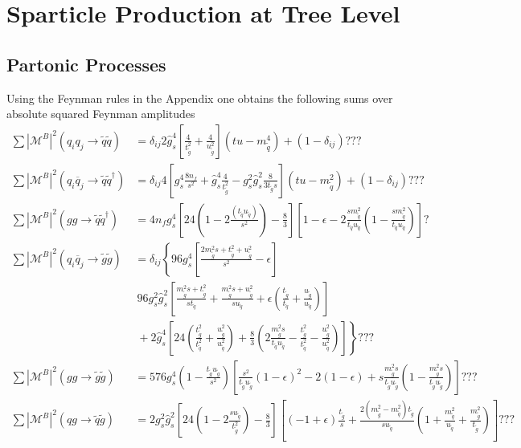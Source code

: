 \section{Sparticle Production at Tree Level}



\subsection{Partonic Processes}
Using the Feynman rules in the Appendix one obtains the following sums over absolute squared Feynman amplitudes
\begin{align}
\sum|\mathcal{M}^B|^2(q_i q_j \to \tilde{q}\tilde{q}) &= \delta_{ij} 2\hat{g}_s^4\left[ \frac{4}{t_{\tilde{g}}^2} + \frac{4}{u_{\tilde{g}}^2} \right] (tu-m_{\tilde{q}}^4) + (1-\delta_{ij}) ??? \nonumber\\
\sum|\mathcal{M}^B|^2(q_i\overline{q}_j \to \tilde{q}\tilde{q}^\dagger) &= \delta_{ij} 4 \left[ g_s^4\frac{8n_f}{s^2} + \hat{g}_s^4\frac{4}{t_{\tilde{g}}^2} - g_s^2\hat{g}_s^2\frac{8}{3 t_{\tilde{g}} s} \right] (tu-m_{\tilde{q}}^2) + (1-\delta_{ij})??? \nonumber\\
\sum|\mathcal{M}^B|^2(gg \to \tilde{q}\tilde{q}^\dagger) &= 4 n_f g_s^4 \left[ 24\left(1-2\frac{(t_{\tilde{q}}u_{\tilde{q}})}{s^2}\right)-\frac{8}{3} \right] \left[ 1-\epsilon-2\frac{s m_{\tilde{q}}^2}{t_{\tilde{q}}u_{\tilde{q}}} \left( 1-\frac{s m_{\tilde{q}}^2}{t_{\tilde{q}}u_{\tilde{q}}} \right)\right]?\nonumber\\
\sum|\mathcal{M}^B|^2(q_i\overline{q}_j \to \tilde{g}\tilde{g}) &= \delta_{ij}\left\{ 96 g_s^4 \left[ \frac{2m_{\tilde{g}}^2 s + t_{\tilde{g}}^2 + u_{\tilde{g}}^2}{s^2} -\epsilon \right]\right.\nonumber\\
&\ 96 g_s^2 \hat{g}_s^2\left[ \frac{m_{\tilde{g}}^2 s + t_{\tilde{g}}^2}{s t_{\tilde{q}}} + \frac{m_{\tilde{g}}^2 s + u_{\tilde{g}}^2}{su_{\tilde{q}}} + \epsilon\left( \frac{t_{\tilde{g}}}{t_{\tilde{q}}} + \frac{u_{\tilde{g}}}{u_{\tilde{q}}} \right) \right]\nonumber\\
&\ + \left.2\hat{g}_s^4\left[ 24\left( \frac{t_{\tilde{g}}^2}{t_{\tilde{q}}^2} + \frac{u_{\tilde{g}}^2}{u_{\tilde{q}}^2} \right) + \frac{8}{3}\left( 2\frac{m_{\tilde{g}}^2 s}{t_{\tilde{q}}u_{\tilde{q}}} - \frac{t_{\tilde{g}}^2}{t_{\tilde{q}}^2} - \frac{u_{\tilde{g}}^2}{u_{\tilde{q}}^2} \right) \right]\right\} ??? \nonumber\\
\sum|\mathcal{M}^B|^2(gg \to \tilde{g}\tilde{g}) &=  576 g_s^4 \left( 1- \frac{t_{\tilde{g}}u_{\tilde{g}}}{s^2} \right)\left[ \frac{s^2}{t_{\tilde{g}}u_{\tilde{g}}}(1-\epsilon)^2-2(1-\epsilon) + s\frac{m_{\tilde{g}}^2 s}{t_{\tilde{g}}u_{\tilde{g}}}\left(1-\frac{m_{\tilde{g}}^2 s}{t_{\tilde{g}}u_{\tilde{g}}}  \right) \right] ??? \nonumber\\
\sum|\mathcal{M}^B|^2(qg \to \tilde{q}\tilde{g}) &=  2g_s^2\hat{g}_s^2 \left[ 24\left(1-2\frac{s u_{\tilde{q}}}{t_{\tilde{g}}^2}\right) - \frac{8}{3} \right]\left[ (-1+\epsilon)\frac{t_{\tilde{g}}}{s} + \frac{2(m_{\tilde{g}}^2-m_{\tilde{q}}^2)t_{\tilde{g}}}{s u_{\tilde{q}}}\left( 1+\frac{m_{\tilde{q}}^2}{u_{\tilde{q}}} + \frac{m_{\tilde{g}}^2}{t_{\tilde{g}}} \right) \right]???
\end{align}
